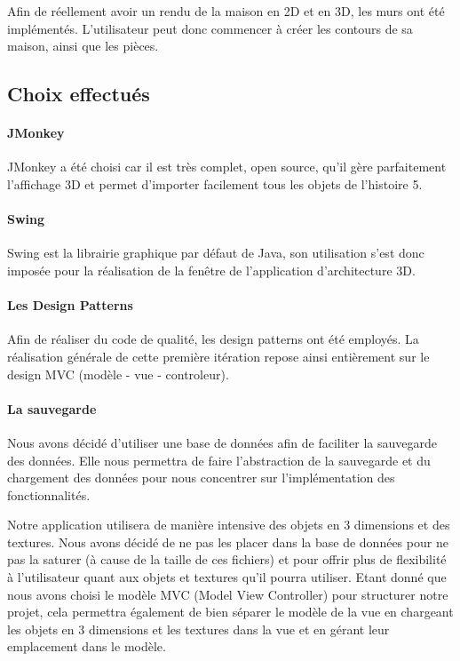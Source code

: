 \documentclass[a4paper, 12pt]{report}
\begin{document}
				Afin de réellement avoir un rendu de la maison en 2D et en 3D, les murs ont été implémentés. L'utilisateur peut donc commencer à créer les contours de sa maison, ainsi que les pièces.
			
			\subsection{Choix effectués}
				\paragraph{JMonkey} JMonkey a été choisi car il est très complet, open source, qu'il gère parfaitement l'affichage 3D et permet d'importer facilement tous les objets de l'histoire 5.
				\paragraph{Swing}
					Swing est la librairie graphique par défaut de Java, son utilisation s'est donc imposée pour la réalisation de la fenêtre de l'application d'architecture 3D.					
				\paragraph{Les Design Patterns} Afin de réaliser du code de qualité, les design patterns ont été employés. La réalisation générale de cette première itération repose ainsi entièrement sur le design MVC (modèle - vue - controleur). 
				\paragraph{La sauvegarde} Nous avons décidé d'utiliser une base de données afin de faciliter la sauvegarde des données. Elle nous permettra de faire l'abstraction de la sauvegarde et du chargement des données pour nous concentrer sur l'implémentation des fonctionnalités.
				
Notre application utilisera de manière intensive des objets en 3 dimensions et des textures. Nous avons décidé de ne pas les placer dans la base de données pour ne pas la saturer (à cause de la taille de ces fichiers) et pour offrir plus de flexibilité à l'utilisateur quant aux objets et textures qu'il pourra utiliser. Etant donné que nous avons choisi le modèle MVC (Model View Controller) pour structurer notre projet, cela permettra également de bien séparer le modèle de la vue en chargeant les objets en 3 dimensions et les textures dans la vue et en gérant leur emplacement dans le modèle.
\end{document}
